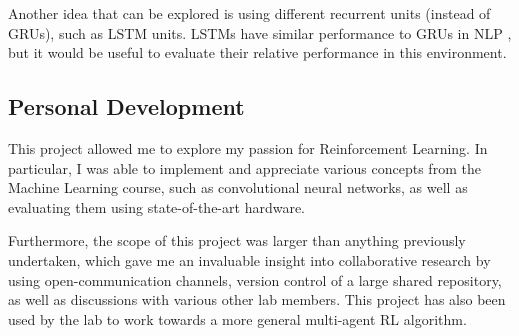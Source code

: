 Another idea that can be explored is using different recurrent units (instead of GRUs), such as LSTM units. LSTMs have similar performance to GRUs in NLP \cite{lstmvsgru}, but it would be useful to evaluate their relative performance in this environment. 

\subsection{Personal Development}
This project allowed me to explore my passion for Reinforcement Learning. In particular, I was able to implement and appreciate various concepts from the Machine Learning course, such as convolutional neural networks, as well as evaluating them using state-of-the-art hardware.

Furthermore, the scope of this project was larger than anything previously undertaken, which gave me an invaluable insight into collaborative research by using open-communication channels, version control of a large shared repository, as well as discussions with various other lab members. This project has also been used by the lab to work towards a more general multi-agent RL algorithm.